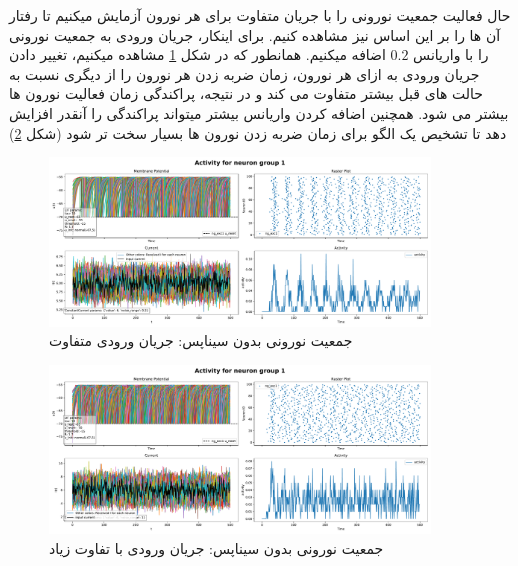         حال فعالیت جمعیت نورونی را با جریان متفاوت برای هر نورون آزمایش میکنیم تا رفتار آن ها را بر این اساس نیز مشاهده کنیم. برای اینکار، جریان ورودی به جمعیت نورونی را با واریانس 
        $0.2$
        اضافه میکنیم. همانطور که در شکل 
        \ref{fig:part1-simple-ng-variance-curr}
        مشاهده میکنیم، تغییر دادن جریان ورودی به ازای هر نورون، زمان ضربه زدن هر نورون را از دیگری نسبت به حالت های قبل بیشتر متفاوت می کند و در نتیجه، پراکندگی زمان فعالیت نورون ها بیشتر می شود. همچنین اضافه کردن واریانس بیشتر میتواند پراکندگی را آنقدر افزایش دهد تا تشخیص یک الگو برای زمان ضربه زدن نورون ها بسیار سخت تر شود
        (شکل \ref{fig:part1-simple-ng-high-variance-curr})
        \begin{figure}[!ht]
            \centering
            \includegraphics[width=0.9\textwidth]{plots/part1-Simple-ng-without-synapse-variance-curr.pdf} 
            \caption{جمعیت نورونی بدون سیناپس: جریان ورودی متفاوت}
            \label{fig:part1-simple-ng-variance-curr}
        \end{figure}
        \begin{figure}[!ht]
            \centering
            \includegraphics[width=0.9\textwidth]{plots/part1-Simple-ng-without-synapse-high-variance-curr.pdf} 
            \caption{جمعیت نورونی بدون سیناپس: جریان ورودی با تفاوت زیاد}
            \label{fig:part1-simple-ng-high-variance-curr}
        \end{figure}


